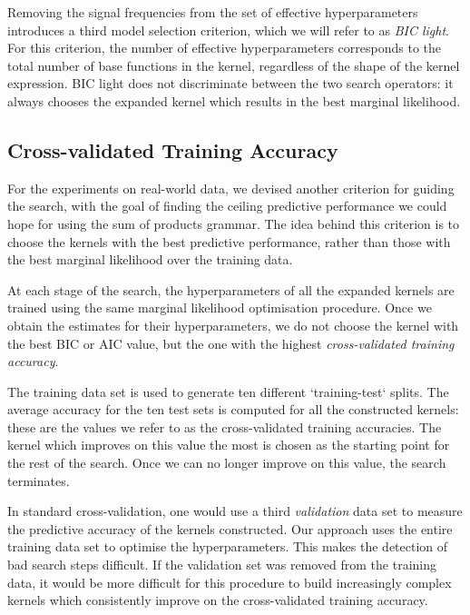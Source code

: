 \documentclass[a4paper,12pt ]{report}
\begin{document}
Removing the signal frequencies from the set of effective hyperparameters introduces a third model selection criterion, which we will refer to as \emph{BIC light}. For this criterion, the number of effective hyperparameters corresponds to the total number of base functions in the kernel, regardless of the shape of the kernel expression. BIC light does not discriminate between the two search operators: it always chooses the expanded kernel which results in the best marginal likelihood. %

\subsection{Cross-validated Training Accuracy}



For the experiments on real-world data, we devised another criterion for guiding the search, with the goal of finding the ceiling predictive performance we could hope for using the sum of products grammar. The idea behind this criterion is to choose the kernels with the best predictive performance, rather than those with the best marginal likelihood over the training data.

At each stage of the search, the hyperparameters of all the expanded kernels are trained using the same marginal likelihood optimisation procedure. Once we obtain the estimates for their hyperparameters, we do not choose the kernel with the best BIC or AIC value, but the one with the highest \emph{cross-validated training accuracy}.

The training data set is used to generate ten different `training-test` splits. The average accuracy for the ten test sets is computed for all the constructed kernels: these are the values we refer to as the cross-validated training accuracies. The kernel which improves on this value the most is chosen as the starting point for the rest of the search. Once we can no longer improve on this value, the search terminates.

In standard cross-validation, one would use a third \emph{validation} data set to measure the predictive accuracy of the kernels constructed. Our approach uses the entire training data set to optimise the hyperparameters. This makes the detection of bad search steps difficult. If the validation set was removed from the training data, it would be more difficult for this procedure to build increasingly complex kernels which consistently improve on the cross-validated training accuracy.
\end{document}
